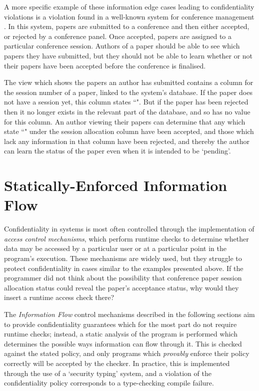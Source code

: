 A more specific example of these information edge cases leading to confidentiality violations is a violation found in a well-known system for conference management \cite{agrawal2016edas_conf} \cite{polikarpova2016lifty}. In this system, papers are submitted to a conference and then either accepted, or rejected by a conference panel. Once accepted, papers are assigned to a particular conference session. Authors of a paper should be able to see which papers they have submitted, but they should not be able to learn whether or not their papers have been accepted before the conference is finalised.

The view which shows the papers an author has submitted contains a column for the session number of a paper, linked to the system's database. If the paper does not have a session yet, this column states ``". But if the paper has been rejected then it no longer exists in the relevant part of the database, and so has no value for this column. An author viewing their papers can determine that any which state ``" under the session allocation column have been accepted, and those which lack any information in that column have been rejected, and thereby the author can learn the status of the paper even when it is intended to be `pending'.

\section{Statically-Enforced Information Flow}

Confidentiality in systems is most often controlled through the implementation of \textit{access control mechanisms}, which perform runtime checks to determine whether data may be accessed by a particular user or at a particular point in the program's execution. These mechanisms are widely used, but they struggle to protect confidentiality in cases similar to the examples presented above. If the programmer did not think about the possibility that conference paper session allocation status could reveal the paper's acceptance status, why would they insert a runtime access check there?

The \textit{Information Flow} control mechanisms described in the following sections aim to provide confidentiality guarantees which for the most part do not require runtime checks; instead, a static analysis of the program is performed which determines the possible ways information can flow through it. This is checked against the stated policy, and only programs which \textit{provably} enforce their policy correctly will be accepted by the checker. In practice, this is implemented through the use of a `security typing' system, and a violation of the confidentiality policy corresponds to a type-checking compile failure.

